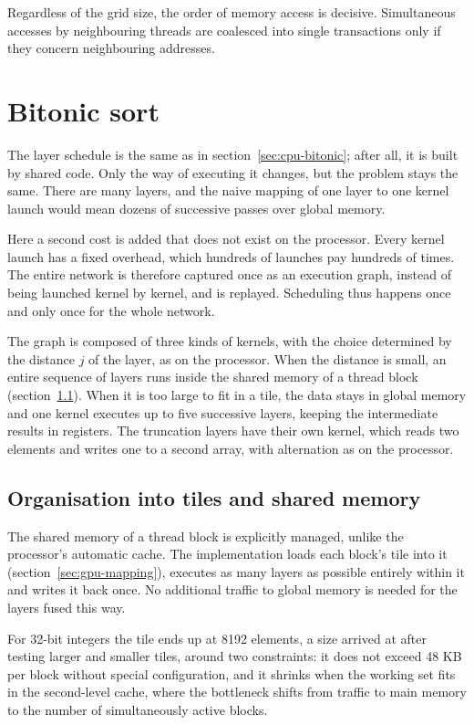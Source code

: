 Regardless of the grid size, the order of memory access is decisive.
Simultaneous accesses by neighbouring threads are coalesced into single
transactions only if they concern neighbouring addresses.

\section{Bitonic sort}
\label{sec:gpu-bitonic}

The layer schedule is the same as in section~\ref{sec:cpu-bitonic}; after all,
it is built by shared code. Only the way of executing it changes, but the
problem stays the same. There are many layers, and the naive mapping of one
layer to one kernel launch would mean dozens of successive passes over global
memory.

Here a second cost is added that does not exist on the processor. Every kernel
launch has a fixed overhead, which hundreds of launches pay hundreds of times.
The entire network is therefore captured once as an execution graph, instead of
being launched kernel by kernel, and is replayed. Scheduling thus happens once
and only once for the whole network.

The graph is composed of three kinds of kernels, with the choice determined by
the distance $j$ of the layer, as on the processor. When the distance is small,
an entire sequence of layers runs inside the shared memory of a thread block
(section~\ref{sec:gpu-bitonic-tiles}). When it is too large to fit in a tile,
the data stays in global memory and one kernel executes up to five successive
layers, keeping the intermediate results in registers. The truncation layers
have their own kernel, which reads two elements and writes one to a second
array, with alternation as on the processor.

\subsection{Organisation into tiles and shared memory}
\label{sec:gpu-bitonic-tiles}

The shared memory of a thread block is explicitly managed, unlike the
processor's automatic cache. The implementation loads each block's tile into it
(section~\ref{sec:gpu-mapping}), executes as many layers as possible entirely
within it and writes it back once. No additional traffic to global memory is
needed for the layers fused this way.

For 32-bit integers the tile ends up at 8192 elements, a size arrived at after
testing larger and smaller tiles, around two constraints: it does not exceed 48
KB per block without special configuration, and it shrinks when the working set
fits in the second-level cache, where the bottleneck shifts from traffic to
main memory to the number of simultaneously active blocks.

